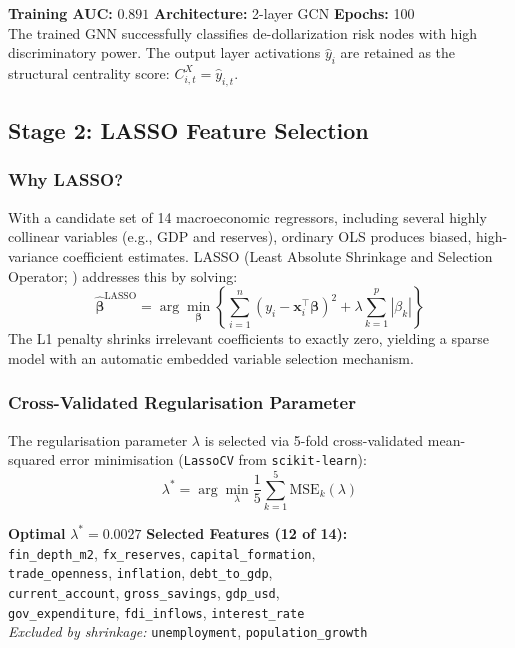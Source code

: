 \documentclass[12pt, letterpaper]{article}
\theoremstyle{definition}
\begin{document}
\begin{resultbox}
\textbf{Training AUC:} $0.891$ \quad \textbf{Architecture:} 2-layer GCN \quad \textbf{Epochs:} 100\\
The trained GNN successfully classifies de-dollarization risk nodes with high discriminatory power. The output layer activations $\hat{y}_i$ are retained as the structural centrality score: $C_{i,t}^X = \hat{y}_{i,t}$.
\end{resultbox}

\subsection{Stage 2: LASSO Feature Selection}

\subsubsection{Why LASSO?}

With a candidate set of 14 macroeconomic regressors, including several highly collinear variables (e.g., GDP and reserves), ordinary OLS produces biased, high-variance coefficient estimates. LASSO (Least Absolute Shrinkage and Selection Operator; \citealt{tibshirani1996regression}) addresses this by solving:
\begin{equation}
\hat{\boldsymbol{\beta}}^{\text{LASSO}} = \arg\min_{\boldsymbol{\beta}} \left\{ \sum_{i=1}^n (y_i - \mathbf{x}_i^\top \boldsymbol{\beta})^2 + \lambda \sum_{k=1}^p |\beta_k| \right\}
\label{eq:lasso}
\end{equation}
The L1 penalty shrinks irrelevant coefficients to exactly zero, yielding a sparse model with an automatic embedded variable selection mechanism.

\subsubsection{Cross-Validated Regularisation Parameter}

The regularisation parameter $\lambda$ is selected via 5-fold cross-validated mean-squared error minimisation (\texttt{LassoCV} from \texttt{scikit-learn}):
\[
\lambda^* = \arg\min_{\lambda} \frac{1}{5} \sum_{k=1}^5 \text{MSE}_k(\lambda)
\]

\begin{resultbox}
\textbf{Optimal} $\lambda^* = 0.0027$ \quad \textbf{Selected Features (12 of 14):}\\
\texttt{fin\_depth\_m2}, \texttt{fx\_reserves}, \texttt{capital\_formation},\\
\texttt{trade\_openness}, \texttt{inflation}, \texttt{debt\_to\_gdp},\\
\texttt{current\_account}, \texttt{gross\_savings}, \texttt{gdp\_usd},\\
\texttt{gov\_expenditure}, \texttt{fdi\_inflows}, \texttt{interest\_rate}\\
\textit{Excluded by shrinkage: } \texttt{unemployment}, \texttt{population\_growth}
\end{resultbox}
\end{document}
